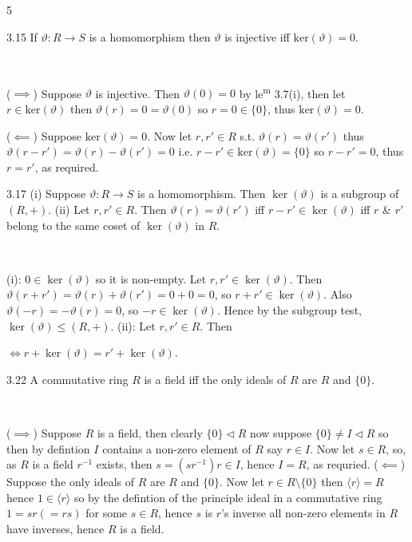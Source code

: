 \documentclass[8pt]{extarticle}
\makeatletter
\newcommand{\fitdisplay}[1]{%
  \par\vspace{-1pt}\noindent
  \sbox{\fitdisplaybox}{#1}%
  \makebox[\columnwidth][c]{%
    \ifdim\wd\fitdisplaybox>\columnwidth
      \resizebox{\columnwidth}{!}{#1}%
    \else
      \usebox{\fitdisplaybox}%
    \fi
  }%
  \par\vspace{-1pt}%
}
\renewenvironment{proof}[1][\proofname]{%
  \pushQED{\qed}%
  \par\noindent\normalfont\itshape #1\@addpunct{.}\ \normalfont\ignorespaces
}{%
  \popQED%
  \par
}
\makeatother
\begin{document}
\begin{multicols*}{5}
        \begin{lemma}{3.15}
            If \(\vartheta: R\to S\) is a homomorphism then \(\vartheta\) is injective iff \(\text{ker}(\vartheta)={0}\).
        \end{lemma}

        \begin{proof}
            (\(\implies\)) Suppose \(\vartheta\) is injective. Then \(\vartheta(0)=0\) by le\textsuperscript{m} 3.7(i), then let \(r\in\text{ker}(\vartheta)\) then \(\vartheta(r)=0=\vartheta(0)\) so \(r=0\in\{0\}\), thus \(\text{ker}(\vartheta)={0}\).

            (\(\impliedby\)) Suppose \(\text{ker}(\vartheta)={0}\). Now let \(r,r'\in R\) s.t. \(\vartheta(r)=\vartheta(r')\) thus \(\vartheta(r-r')=\vartheta(r)-\vartheta(r')=0\) i.e. \(r-r'\in\text{ker}(\vartheta)=\{0\}\) so \(r-r'=0\), thus \(r=r'\), as required.
        \end{proof}

        \begin{lemma}{3.17}
            (i) Suppose \(\vartheta:R\to S\) is a homomorphism. Then \(\ker(\vartheta)\) is a subgroup of \((R,+)\). (ii) Let \(r,r'\in R\). Then \(\vartheta(r)=\vartheta(r')\) iff \(r-r'\in\ker(\vartheta)\) iff \(r\) \& \(r'\) belong to the same coset of \(\ker(\vartheta)\) in \(R\).
        \end{lemma}

        \begin{proof}
            (i): \(0\in\ker(\vartheta)\) so it is non-empty. Let \(r,r'\in\ker(\vartheta)\). Then \(\vartheta(r+r')=\vartheta(r)+\vartheta(r')=0+0=0\), so \(r+r'\in\ker(\vartheta)\). Also \(\vartheta(-r)=-\vartheta(r)=0\), so \(-r\in\ker(\vartheta)\). Hence by the subgroup test, \(\ker(\vartheta)\le(R,+)\). (ii): Let \(r,r'\in R\). Then
            \fitdisplay{\(\vartheta(r)=\vartheta(r')\Leftrightarrow\vartheta(r-r')=0\Leftrightarrow r-r'\in\ker(\vartheta)\)}
            \(\Leftrightarrow r+\ker(\vartheta)=r'+\ker(\vartheta)\).
        \end{proof}

        \begin{proposition}{3.22}
            A commutative ring \(R\) is a field iff the only ideals of \(R\) are \(R\) and \(\{0\}\).
        \end{proposition}

        \begin{proof}
            (\(\implies\)) Suppose \(R\) is a field, then clearly \(\{0\}\lhd R\) now suppose \(\{0\}\ne I\lhd R\) so then by defintion \(I\) contains a non-zero element of \(R\) say \(r\in I\). Now let \(s\in R\), so, as \(R\) is a field \(r^{-1}\) exists, then \(s=(sr^{-1})r\in I\), hence \(I=R\), as requried.
            (\(\impliedby\)) Suppose the only ideals of \(R\) are \(R\) and \(\{0\}\). Now let \(r\in R\setminus\{0\}\) then \(\langle r\rangle=R\) hence \(1\in\langle r\rangle\) so by the defintion of the principle ideal in a commutative ring \(1=sr(=rs)\) for some \(s\in R\), hence \(s\) is \(r\)'s inverse all non-zero elements in \(R\) have inverses, hence \(R\) is a field.
        \end{proof}


\end{multicols*}
\end{document}
